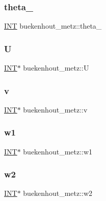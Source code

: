 \subsubsection{\texorpdfstring{theta\+\_}{theta\_3}}
{\footnotesize\ttfamily \mbox{\hyperlink{galois_8h_a09fddde158a3a20bd2dcadb609de11dc}{I\+NT}} buekenhout\+\_\+metz\+::theta\+\_}

\mbox{\label{classbuekenhout__metz_a077f205b35b27aa568f44656fb4b07d9}} 
\subsubsection{\texorpdfstring{U}{U}}
{\footnotesize\ttfamily \mbox{\hyperlink{galois_8h_a09fddde158a3a20bd2dcadb609de11dc}{I\+NT}}$\ast$ buekenhout\+\_\+metz\+::U}

\mbox{\label{classbuekenhout__metz_a09ac8f4d307630a5a096fc5472fbaf8d}} 
\subsubsection{\texorpdfstring{v}{v}}
{\footnotesize\ttfamily \mbox{\hyperlink{galois_8h_a09fddde158a3a20bd2dcadb609de11dc}{I\+NT}}$\ast$ buekenhout\+\_\+metz\+::v}

\mbox{\label{classbuekenhout__metz_aedbd8974b4f6435c71f54f930ffd9870}} 
\subsubsection{\texorpdfstring{w1}{w1}}
{\footnotesize\ttfamily \mbox{\hyperlink{galois_8h_a09fddde158a3a20bd2dcadb609de11dc}{I\+NT}}$\ast$ buekenhout\+\_\+metz\+::w1}

\mbox{\label{classbuekenhout__metz_af117d77c3675bc73ecdcde902c918fdd}} 
\subsubsection{\texorpdfstring{w2}{w2}}
{\footnotesize\ttfamily \mbox{\hyperlink{galois_8h_a09fddde158a3a20bd2dcadb609de11dc}{I\+NT}}$\ast$ buekenhout\+\_\+metz\+::w2}


